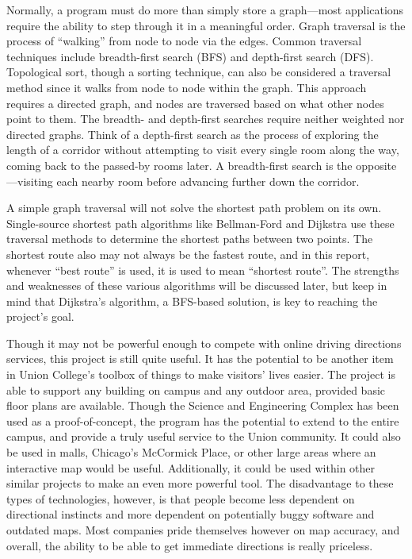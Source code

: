 \documentclass[12pt,letterpaper,titlepage]{article}   %
\begin{document}
Normally, a program must do more than simply store a graph---most
applications require the ability to step through it in a meaningful
order. Graph traversal is the process of ``walking'' from node to node
via the edges. Common traversal techniques include breadth-first search
(BFS) and depth-first search (DFS). Topological sort, though a sorting
technique, can also be considered a traversal method since it walks from
node to node within the graph. This approach requires a directed graph,
and nodes are traversed based on what other nodes point to them. The
breadth- and depth-first searches require neither weighted nor directed
graphs. Think of a depth-first search as the process of exploring the
length of a corridor without attempting to visit every single room along
the way, coming back to the passed-by rooms later. A breadth-first
search is the opposite---visiting each nearby room before advancing
further down the corridor.

A simple graph traversal will not solve the shortest path problem on its
own. Single-source shortest path algorithms like Bellman-Ford and
Dijkstra use these traversal methods to determine the shortest paths
between two points. The shortest route also may not always be the
fastest route, and in this report, whenever ``best route'' is used, it
is used to mean ``shortest route''. The strengths and weaknesses of
these various algorithms will be discussed later, but keep in mind that
Dijkstra's algorithm, a BFS-based solution, is key to reaching the
project's goal. 

Though it may not be powerful enough to compete with online driving
directions services, this project is still quite useful. It has the
potential to be another item in Union College's toolbox of things to
make visitors' lives easier. The project is able to support any building
on campus and any outdoor area, provided basic floor plans are
available. Though the Science and Engineering Complex has been used as a
proof-of-concept, the program has the potential to extend to the entire
campus, and provide a truly useful service to the Union community. It
could also be used in malls, Chicago's McCormick Place, or other large
areas where an interactive map would be useful. Additionally, it could
be used within other similar projects to make an even more powerful
tool. The disadvantage to these types of technologies, however, is that
people become less dependent on directional instincts and more dependent
on potentially buggy software and outdated maps. Most companies pride
themselves however on map accuracy, and overall, the ability to be able
to get immediate directions is really priceless. 
\end{document}
